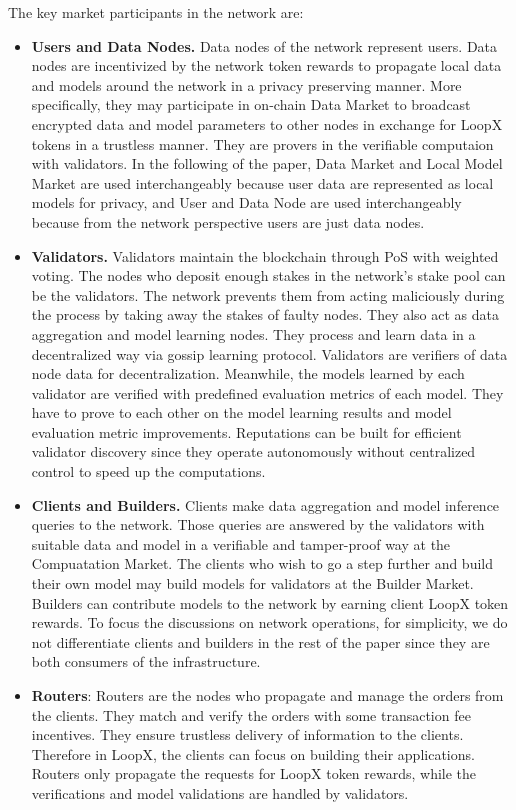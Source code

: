 \documentclass[11pt,letterpaper]{article}
\begin{document}
The key market participants in the network are:
\begin{itemize}
    \item \textbf{Users and Data Nodes.} Data nodes of the network represent users. Data nodes are incentivized by the network token rewards to propagate local data and models around the network in a privacy preserving manner. More specifically, they may participate in on-chain Data Market to broadcast encrypted data and model parameters to other nodes in exchange for LoopX tokens in a trustless manner. They are provers in the verifiable computaion with validators. In the following of the paper, Data Market and Local Model Market are used interchangeably because user data are represented as local models for privacy, and User and Data Node are used interchangeably because from the network perspective users are just data nodes.
    
    \item \textbf{Validators.} Validators maintain the blockchain through PoS with weighted voting. The nodes who deposit enough stakes in the network's stake pool can be the validators. The network prevents them from acting maliciously during the process by taking away the stakes of faulty nodes. They also act as data aggregation and model learning nodes. They process and learn data in a decentralized way via gossip learning protocol. Validators are verifiers of data node data for decentralization. Meanwhile, the models learned by each validator are verified with predefined evaluation metrics of each model. They have to prove to each other on the model learning results and model evaluation metric improvements. Reputations can be built for efficient validator discovery since they operate autonomously without centralized control to speed up the computations.
    
    \item \textbf{Clients and Builders.} Clients make data aggregation and model inference queries to the network. Those queries are answered by the validators with suitable data and model in a verifiable and tamper-proof way at the Compuatation Market. The clients who wish to go a step further and build their own model may build models for validators at the Builder Market. Builders can contribute models to the network by earning client LoopX token rewards. To focus the discussions on network operations, for simplicity, we do not differentiate clients and builders in the rest of the paper since they are both consumers of the infrastructure.
    
    \item \textbf{Routers}: Routers are the nodes who propagate and manage the orders from the clients. They match and verify the orders with some transaction fee incentives. They ensure trustless delivery of information to the clients. Therefore in LoopX, the clients can focus on building their applications. Routers only propagate the requests for LoopX token rewards, while the verifications and model validations are handled by validators.
\end{itemize}
\end{document}
